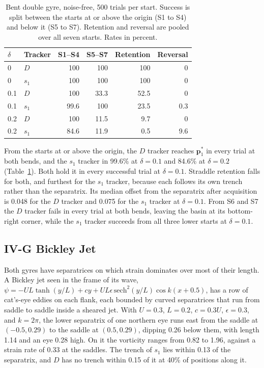\documentclass[11pt]{article}
\begin{document}
\begin{table}[H]
\centering
\caption{Bent double gyre, noise-free, 500 trials per start. Success is
split between the starts at or above the origin (S1 to S4) and below it
(S5 to S7). Retention and reversal are pooled over all seven starts.
Rates in percent.}
\label{tab:bent}
\begin{tabular}{llrrrr}
\toprule
$\delta$ & Tracker & S1--S4 & S5--S7 & Retention & Reversal \\
\midrule
0   & $D$   & 100  & 100  & 100  & 0   \\
0   & $s_1$ & 100  & 100  & 100  & 0   \\
0.1 & $D$   & 100  & 33.3 & 52.5 & 0   \\
0.1 & $s_1$ & 99.6 & 100  & 23.5 & 0.3 \\
0.2 & $D$   & 100  & 11.5 & 9.7  & 0   \\
0.2 & $s_1$ & 84.6 & 11.9 & 0.5  & 9.6 \\
\bottomrule
\end{tabular}
\end{table}

From the starts at or above the origin, the $D$ tracker reaches
$\mathbf{p}^*_1$ in every trial at both bends, and the $s_1$ tracker in
99.6\% at $\delta = 0.1$ and 84.6\% at $\delta = 0.2$
(Table~\ref{tab:bent}). Both hold it in every successful trial at
$\delta = 0.1$. Straddle retention falls for both, and furthest for the
$s_1$ tracker, because each follows its own trench rather than the
separatrix. Its median offset from the separatrix after acquisition is
0.048 for the $D$ tracker and 0.075 for the $s_1$ tracker at
$\delta = 0.1$. From S6 and S7 the $D$ tracker fails in every trial at
both bends, leaving the basin at its bottom-right corner, while the $s_1$
tracker succeeds from all three lower starts at $\delta = 0.1$.

\subsection*{IV-G \quad Bickley Jet}

Both gyres have separatrices on which strain dominates over most of their
length. A Bickley jet seen in the frame of its wave,
$\psi = -UL\tanh(y/L) + cy + UL\epsilon\,\mathrm{sech}^2(y/L)\cos k(x + 0.5)$,
has a row of cat's-eye eddies on each flank, each bounded by curved
separatrices that run from saddle to saddle inside a sheared jet. With
$U = 0.3$, $L = 0.2$, $c = 0.3U$, $\epsilon = 0.3$, and $k = 2\pi$, the
lower separatrix of one northern eye runs east from the saddle at
$(-0.5, 0.29)$ to the saddle at $(0.5, 0.29)$, dipping 0.26 below them,
with length 1.14 and an eye 0.28 high. On it the vorticity ranges from
0.82 to 1.96, against a strain rate of 0.33 at the saddles. The trench of
$s_1$ lies within 0.13 of the separatrix, and $D$ has no trench within
0.15 of it at 40\% of positions along it.
\end{document}
